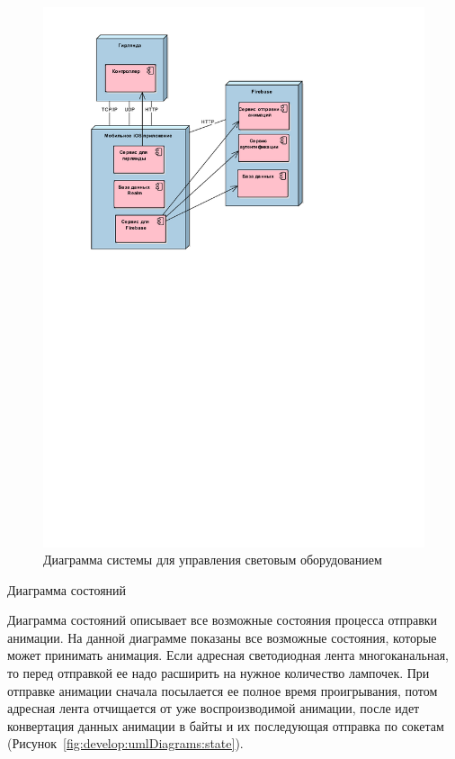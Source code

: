 ~
\begin{figure}[H]
\centering
	\includegraphics[scale=0.8]{figures/diagrams/uml_deployment.pdf}
	\caption{Диаграмма системы для управления световым оборудованием}
	\label{fig:develop:umlDiagrams:deployment}
\end{figure}

Диаграмма состояний

Диаграмма состояний описывает все возможные состояния процесса отправки анимации. На данной диаграмме показаны все возможные состояния, которые может принимать анимация. Если адресная светодиодная лента многоканальная, то перед отправкой ее надо расширить на нужное количество лампочек. При отправке анимации сначала посылается ее полное время проигрывания, потом адресная лента отчищается от уже воспроизводимой анимации, после идет конвертация данных анимации в байты и их последующая отправка по сокетам (Рисунок~\ref{fig:develop:umlDiagrams:state}).

